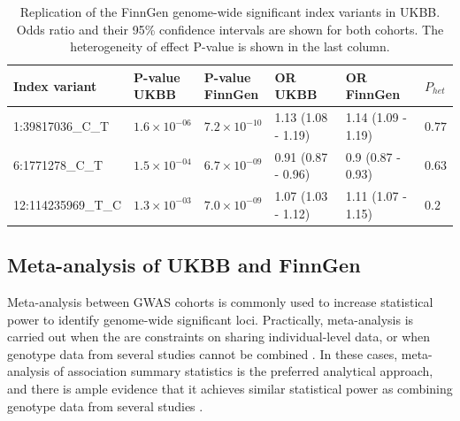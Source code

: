   \begin{table}[H]
    \centering\begingroup\fontsize{10}{12}\selectfont
    \caption[Replication of the FinnGen genome-wide significant index variants in the UKBB]{Replication of the FinnGen genome-wide significant index variants in UKBB. Odds ratio and their 95\% confidence  intervals are shown for both cohorts. The heterogeneity of effect P-value is shown in the last column.}
    \label{table:replication_finngen_in_ukbb}
    \begin{tabular}[t]{llllll}
    \toprule
    Index variant & \makecell{P-value\\ UKBB} & \makecell{P-value\\ FinnGen} & \makecell{OR\\ UKBB} & \makecell{OR\\ FinnGen} & $P_{het}$\\
    \midrule
    1:39817036\_C\_T & $1.6\times10^{-06}$ & $7.2\times10^{-10}$ & 1.13 (1.08 - 1.19) & 1.14 (1.09 - 1.19) & $0.77$\\
    6:1771278\_C\_T & $1.5\times10^{-04}$ & $6.7\times10^{-09}$ & 0.91 (0.87 - 0.96) & 0.9 (0.87 - 0.93) & $0.63$\\
    12:114235969\_T\_C & $1.3\times10^{-03}$ & $7.0\times10^{-09}$ & 1.07 (1.03 - 1.12) & 1.11 (1.07 - 1.15) & $0.2$\\
    \bottomrule
    \end{tabular}
    \endgroup{}
    \end{table}


    \subsection{Meta-analysis of UKBB and FinnGen}
    Meta-analysis between GWAS cohorts is commonly used to increase statistical power to identify genome-wide significant loci. Practically, meta-analysis is carried out when the are constraints on sharing individual-level data, or when genotype data from several studies cannot be combined \cite{Evangelou2013-rn}. In these cases, meta-analysis of association summary statistics is the preferred analytical approach, and there is ample evidence that it achieves similar statistical power as combining genotype data from several studies \cite{metal_docs}. \\



